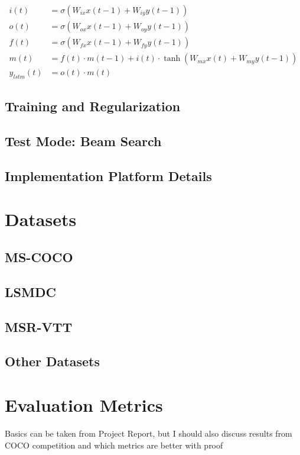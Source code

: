 \begin{align}
	i(t) &= \sigma(W_{ix}x(t-1) + W_{iy}y(t-1))\\
	o(t) &= \sigma(W_{ox}x(t-1) + W_{oy}y(t-1))\\
	f(t) &= \sigma(W_{fx}x(t-1) + W_{fy}y(t-1))\\
	m(t) &= f(t)\cdot m(t-1) + i(t)\cdot \tanh(W_{mx}x(t)+W_{my}y(t-1))\\
	y_{lstm}(t) &= o(t) \cdot m(t)
\end{align}


\subsection{Training and Regularization}
\subsection{Test Mode: Beam Search}
\subsection{Implementation Platform Details}
\section{Datasets}
\subsection{MS-COCO}
\subsection{LSMDC}
\subsection{MSR-VTT}
\subsection{Other Datasets}
\section{Evaluation Metrics}
Basics can be taken from Project Report, but I should also
discuss results from COCO competition and which metrics are better with proof

